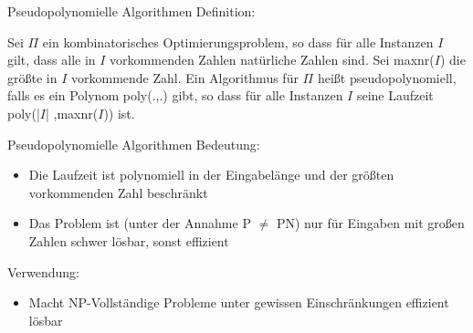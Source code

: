 \begin{frame}{Pseudopolynomielle Algorithmen}
Definition:

Sei $\Pi$ ein kombinatorisches Optimierungsproblem, so dass für alle Instanzen $I$ gilt, dass alle in $I$ vorkommenden Zahlen natürliche Zahlen sind. Sei maxnr($I$) die größte in $I$ vorkommende Zahl. Ein Algorithmus für $\Pi$ heißt pseudopolynomiell, falls es ein Polynom poly(.,.)  gibt, so 
dass für alle Instanzen $I$ seine Laufzeit poly(|$I$| ,maxnr($I$)) ist. 

\end{frame}
\begin{frame}{Pseudopolynomielle Algorithmen}
Bedeutung:

\begin{itemize}
	\item Die Laufzeit ist polynomiell in der Eingabelänge und der größten vorkommenden Zahl beschränkt
	\item Das Problem ist (unter der Annahme P $\neq$ PN) nur für Eingaben mit großen Zahlen schwer lösbar, sonst effizient
\end{itemize}

Verwendung:
\begin{itemize}
	\item Macht NP-Vollständige Probleme unter gewissen Einschränkungen effizient lösbar
\end{itemize}
\end{frame}
